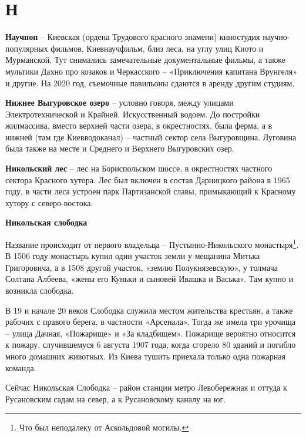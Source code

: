 \chapter*{Н}

\textbf{Научпоп} – Киевская (ордена Трудового красного знамени) киностудия научно-популярных фильмов, Киевнаучфильм, близ леса, на углу улиц Киото и Мурманской. Тут снимались замечательные документальные фильмы, а также мультики Дахно про козаков и Черкасского – «Приключения капитана Врунгеля» и другие. На 2020 год, съемочные павильоны сдаются в аренду другим студиям.\\

\medskip

\textbf{Нижнее Выгуровское озеро} – условно говоря, между улицами Электротехнической и Крайней. Искусственный водоем. До постройки жилмассива, вместо верхней части озера, в окрестностях, была ферма, а в нижней (там где Киевводоканал) – частный сектор села Выгуровщина. Луговина была также на месте и Среднего и Верхнего Выгуровских озер.\\

\medskip

\textbf{Никольский лес} – лес на Бориспольском шоссе, в окрестностях частного сектора Красного хутора. Лес был включен в состав Дарницкого района в 1965 году, в части леса устроен парк Партизанской славы, примыкающий к Красному хутору с северо-востока.\\

\medskip

\textbf{Никольская слободка}

Название происходит от первого владельца – Пустынно-Никольского монастыря\footnote{Что был неподалеку от Аскольдовой могилы.}. В 1506 году монастырь купил один участок земли у мещанина Митька Григоровича, а в 1508 другой участок, «землю Полукнязевскую», у толмача Солтана Албеева, «жены его Куньки и сыновей Ивашка и Васька». Там купно и возникла слободка.

 В 19 и начале 20 веков Слободка служила местом жительства крестьян, а также рабочих с правого берега, в частности «Арсенала». Тогда же имела три урочища – улица Дачная, «Пожарище» и «За кладбищем». Пожарище вероятно относится к пожару, случившемуся 6 августа 1907 года, когда сгорело 80 зданий и погибло много домашних животных. Из Киева тушить приехала только одна пожарная команда.

Сейчас Никольская Слободка – район станции метро Левобережная и оттуда к Русановским садам на север, а к Русановскому каналу на юг.

